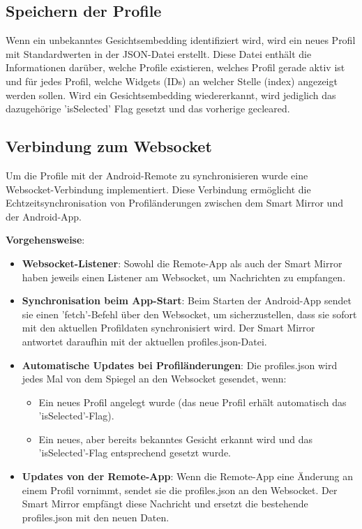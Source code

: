 \subsection{Speichern der Profile}
 Wenn ein unbekanntes Gesichtsembedding identifiziert wird, wird ein neues Profil mit Standardwerten in der JSON-Datei erstellt. Diese Datei enthält die Informationen darüber, welche Profile existieren, welches Profil gerade aktiv ist und für jedes Profil, welche Widgets (IDs) an welcher Stelle (index) angezeigt werden sollen. Wird ein Gesichtsembedding wiedererkannt, wird jediglich das dazugehörige 'isSelected' Flag gesetzt und das vorherige gecleared.


\subsection{Verbindung zum Websocket}
Um die Profile mit der Android-Remote zu synchronisieren wurde eine Websocket-Verbindung implementiert. Diese Verbindung ermöglicht die Echtzeitsynchronisation von Profiländerungen zwischen dem Smart Mirror und der Android-App.

\noindent \textbf{Vorgehensweise}:
\begin{itemize}
    \item \textbf{Websocket-Listener}: Sowohl die Remote-App als auch der Smart Mirror haben jeweils einen Listener am Websocket, um Nachrichten zu empfangen.
    
    \item \textbf{Synchronisation beim App-Start}: Beim Starten der Android-App sendet sie einen 'fetch'-Befehl über den Websocket, um sicherzustellen, dass sie sofort mit den aktuellen Profildaten synchronisiert wird. Der Smart Mirror antwortet daraufhin mit der aktuellen profiles.json-Datei.

    \item \textbf{Automatische Updates bei Profiländerungen}: Die profiles.json wird jedes Mal von dem Spiegel an den Websocket gesendet, wenn:
    \begin{itemize}
        \item Ein neues Profil angelegt wurde (das neue Profil erhält automatisch das 'isSelected'-Flag).
        \item Ein neues, aber bereits bekanntes Gesicht erkannt wird und das 'isSelected'-Flag entsprechend gesetzt wurde.
    \end{itemize}

    \item \textbf{Updates von der Remote-App}: Wenn die Remote-App eine Änderung an einem Profil vornimmt, sendet sie die profiles.json an den Websocket. Der Smart Mirror empfängt diese Nachricht und ersetzt die bestehende profiles.json mit den neuen Daten.
\end{itemize}

